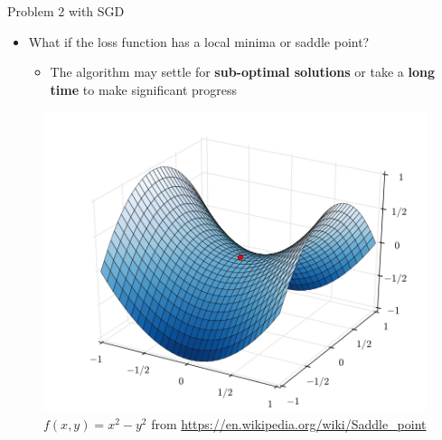 \documentclass[serif, aspectratio=169]{beamer}
\begin{document}
\begin{frame}{Problem 2 with SGD}
    \begin{minipage}{0.4\textwidth}
        \begin{itemize}
        \item What if the loss function has a local minima or saddle point?
        \begin{itemize}
            \item The algorithm may settle for \textbf{sub-optimal solutions} or take a \textbf{long time} to make significant progress
        \end{itemize}
        \end{itemize}
    \end{minipage}%
    \begin{minipage}{0.6\textwidth}
        \centering
        \begin{center}
        \begin{figure}
        \centering
            \includegraphics[width=0.75\linewidth]{pic/saddle_wiki.png}
            \caption{$f(x,y) = x^2 - y^2$ from \url{https://en.wikipedia.org/wiki/Saddle_point}}
        \end{figure}
        \end{center}
    \end{minipage}
\end{frame}
\end{document}

